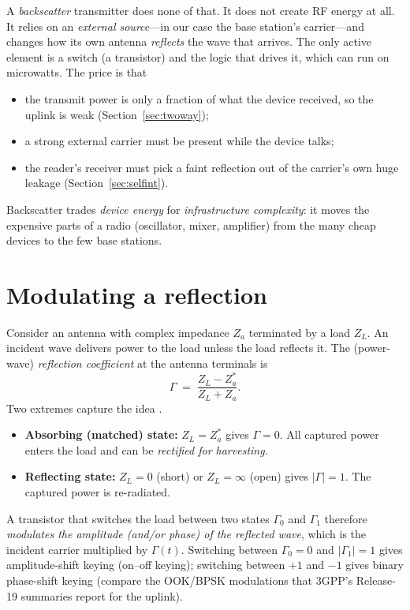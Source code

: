 A \emph{backscatter} transmitter does none of that. It does not create RF
energy at all. It relies on an \emph{external source}---in our case the base
station's carrier---and changes how its own antenna \emph{reflects} the wave that
arrives. The only active element is a switch (a transistor) and the logic that
drives it, which can run on microwatts. The price is that
\begin{itemize}
 \item the transmit power is only a fraction of what the device received, so the uplink is weak (Section~\ref{sec:twoway});
 \item a strong external carrier must be present while the device talks;
 \item the reader's receiver must pick a faint reflection out of the carrier's own huge leakage (Section~\ref{sec:selfint}).
\end{itemize}
\begin{keyidea}
Backscatter trades \emph{device energy} for \emph{infrastructure complexity}: it moves the expensive parts of a radio (oscillator, mixer, amplifier) from the many cheap devices to the few base stations.
\end{keyidea}

\section{Modulating a reflection}
\label{sec:reflection}

Consider an antenna with complex impedance $Z_a$ terminated by a load $Z_L$. An
incident wave delivers power to the load unless the load reflects it. The
(power-wave) \emph{reflection coefficient} at the antenna terminals is
\begin{equation}
 \Gamma \;=\; \frac{Z_L-Z_a^{*}}{Z_L+Z_a}.
\label{eq:gamma}
\end{equation}
Two extremes capture the idea \citep{pozar2011,dobkin2012}.
\begin{itemize}
 \item \textbf{Absorbing (matched) state:} $Z_L=Z_a^{*}$ gives $\Gamma=0$. All captured
   power enters the load and can be \emph{rectified for harvesting}.
 \item \textbf{Reflecting state:} $Z_L=0$ (short) or $Z_L=\infty$ (open) gives
   $|\Gamma|=1$. The captured power is re-radiated.
\end{itemize}
A transistor that switches the load between two states $\Gamma_0$ and $\Gamma_1$ therefore
\emph{modulates the amplitude (and/or phase) of the reflected wave}, which is
the incident carrier multiplied by $\Gamma(t)$. Switching between $\Gamma_0=0$ and
$|\Gamma_1|=1$ gives amplitude-shift keying (on--off keying); switching between $+1$ and
$-1$ gives binary phase-shift keying (compare the OOK/BPSK modulations that
3GPP's Release-19 summaries report for the uplink).

